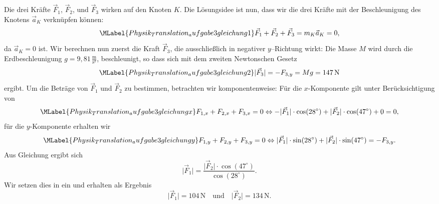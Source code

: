 \begin{MExercises}
\begin{MExercise}
               \begin{MSolution}
               Die drei Kr\"afte $\vec{F}_1$, $\vec{F}_2$, und $\vec{F}_3$ wirken auf den Knoten $K$. Die L\"osungsidee ist nun, dass wir die drei Kr\"afte mit der Beschleunigung des Knotens $\vec{a}_K$ verkn\"upfen k\"onnen: 
               \begin{equation}\MLabel{Physik_Translation_aufgabe3gleichung1}
               \vec{F}_1+\vec{F}_2+\vec{F}_3=m_K\vec{a}_K=0,
               \end{equation} da $\vec{a}_K=0$ ist. Wir berechnen nun zuerst die Kraft $\vec{F}_3$, die ausschlie{\ss}lich in negativer $y$--Richtung wirkt: Die Masse $M$ wird durch die Erdbeschleunigung $g={9,81}\, \frac{\text{m}}{\text{s}^2}$, beschleunigt, so dass sich mit dem zweiten Newtonschen Gesetz 
               \begin{equation}\MLabel{Physik_Translation_aufgabe3gleichung2}
               \vert \vec{F}_3\vert=-F_{3,y}=Mg=147\,\text{N}
               \end{equation} ergibt. Um die Betr\"age von $\vec{F}_1$ und $\vec{F}_2$ zu bestimmen, betrachten wir  komponentenweise: F\"ur die $x$-Komponente gilt unter Ber\"ucksichtigung von 
               \begin{equation}\MLabel{Physik_Translation_aufgabe3gleichungx}
               F_{1,x}+F_{2,x}+F_{3,x}=0\Leftrightarrow -\vert \vec{F}_1\vert\cdot\cos(28^{\circ})+\vert \vec{F}_2\vert\cdot\cos(47^{\circ})+0=0,
               \end{equation}f\"ur die $y$-Komponente erhalten wir
               \begin{equation}\MLabel{Physik_Translation_aufgabe3gleichungy}
               F_{1,y}+F_{2,y}+F_{3,y}=0\Leftrightarrow \vert \vec{F}_1\vert\cdot\sin(28^{\circ})+\vert \vec{F}_2\vert\cdot\sin(47^{\circ})=-F_{3,y}.
               \end{equation} Aus Gleichung  ergibt sich
               \begin{equation*}
               \vert \vec{F}_1\vert=\frac{\vert \vec{F}_2\vert\cdot\cos(47^{\circ})}{\cos(28^{\circ})}.
               \end{equation*}Wir setzen dies in  ein und erhalten als Ergebnis
               \begin{equation*}
               \vert \vec{F}_1\vert= 104\,\text{N}\quad\text{und}\quad \vert \vec{F}_2\vert= 134\,\text{N.} 
               \end{equation*}
               


\end{MSolution}
\end{MExercise}
\end{MExercises}

